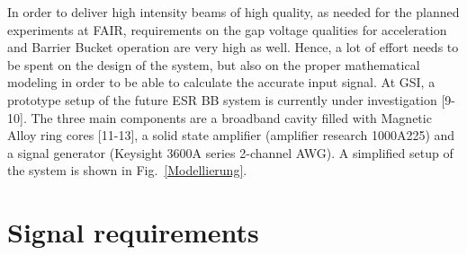 \documentclass[a4paper,
               keeplastbox,%
               nospread%
              ]{jacow}
\begin{document}
	 In order to deliver high intensity beams of high quality, as needed for the planned experiments at FAIR, requirements on the gap voltage 
	 qualities for acceleration and Barrier Bucket operation are very high as well. Hence, a lot of effort needs to be spent on the design of the system, but
	 also on the proper mathematical modeling in order to be able to calculate the accurate input signal.
	 At GSI, a prototype setup of the future ESR BB system is currently under investigation [9-10]. The three main components are a broadband cavity filled with %
	 Magnetic Alloy ring cores [11-13], a solid state amplifier (amplifier research 1000A225) and a signal generator (Keysight 3600A series 2-channel AWG).  %
	 A simplified setup of the system is shown in Fig.~\ref{Modellierung}.	 

	 
	 


	  
	
	
	\section{Signal requirements}
	
\end{document}
